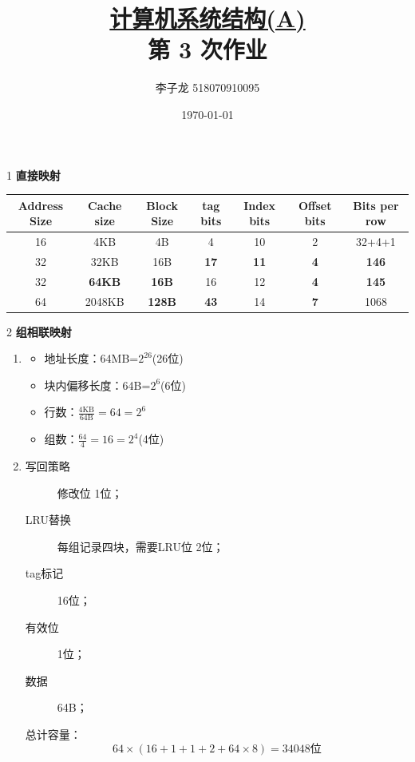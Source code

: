 \documentclass[12pt,a4paper]{article}
\newenvironment{problems}{\begin{list}{}{\renewcommand{\makelabel}[1]{\textbf{##1}.\hfil}}}{\end{list}}
\begin{document}
\title{\normalsize \underline{计算机系统结构(A)}\\\LARGE 第 3 次作业}
\author{李子龙 518070910095}
\date{\today}
\maketitle

\begin{problems}
    \item[1] \textbf{直接映射}
     
\begin{tabular}{ccccccc}
Address Size & Cache size & Block Size &tag bits & Index bits & Offset bits & Bits per row \\
\hline
16& 4KB	    &4B	    &4	&10	&2	    &32+4+1\\
32& 32KB	&16B	& \bfseries 17& \bfseries	11& \bfseries	4&\bfseries	146\\
32& \bfseries 64KB	&\bfseries 16B	&16&	12&	\bfseries 4&\bfseries	145\\
64& 2048KB	&\bfseries 128B	&\bfseries 43&	14&	\bfseries 7&	1068\\
\hline
\end{tabular}

\item[2] \textbf{组相联映射}
\begin{enumerate}[(1)]
    \item 
    \begin{itemize}
        \item 地址长度：64MB=$2^{26}$(26位)
        \item 块内偏移长度：64B=$2^6$(6位)
        \item 行数：$\frac{\text{4KB}}{\text{64B}}=64=2^6$
        \item 组数：$\frac{64}{4}=16=2^4$(4位)
    \end{itemize}
   

    \item \begin{description}
        \item[写回策略] 修改位 1位；
        \item[LRU替换] 每组记录四块，需要LRU位 2位；
        \item[tag标记] 16位；
        \item[有效位]  1位；
        \item[数据]    64B； 
    \end{description}
    总计容量：
    \begin{equation*}
        64\times (16+1+1+2+64\times 8) = 34048\text{位}
    \end{equation*}
\end{enumerate}


\end{problems}
\end{document}

